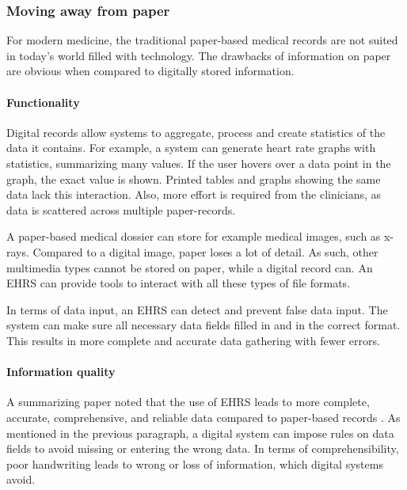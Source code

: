         \subsubsection{Moving away from paper} \label{2_ehrs_paper}

        For modern medicine, the traditional paper-based medical records are not suited in today's world filled with technology. The drawbacks of information on paper are obvious when compared to digitally stored information.

        \paragraph{Functionality} Digital records allow systems to aggregate, process and create statistics of the data it contains. For example, a system can generate heart rate graphs with statistics, summarizing many values. If the user hovers over a data point in the graph, the exact value is shown. Printed tables and graphs showing the same data lack this interaction. Also, more effort is required from the clinicians, as data is scattered across multiple paper-records.

        A paper-based medical dossier can store for example medical images, such as x-rays. Compared to a digital image, paper loses a lot of detail. As such, other multimedia types cannot be stored on paper, while a digital record can. An EHRS can provide tools to interact with all these types of file formats.

        In terms of data input, an EHRS can detect and prevent false data input. The system can make sure all necessary data fields filled in and in the correct format. This results in more complete and accurate data gathering with fewer errors.

        \paragraph{Information quality} A summarizing paper noted that the use of EHRS leads to more complete, accurate, comprehensive, and reliable data compared to paper-based records \cite{ehrs_summary}. As mentioned in the previous paragraph, a digital system can impose rules on data fields to avoid missing or entering the wrong data. In terms of comprehensibility, poor handwriting leads to wrong or loss of information, which digital systems avoid.

